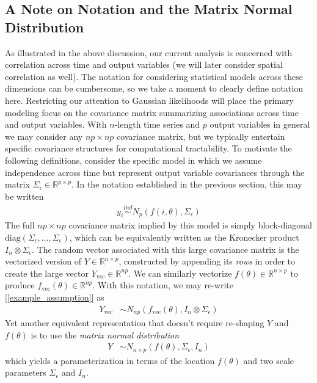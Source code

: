 \documentclass[12pt]{article}
\newcommand{\R}{\mathbb{R}}
\begin{document}
\subsection{A Note on Notation and the Matrix Normal Distribution}
As illustrated in the above discussion, our current analysis is concerned with correlation across time and output variables (we will later consider spatial correlation as well). The 
notation for considering statistical models across these dimensions can be cumbersome, so we take a moment to clearly define notation here. Restricting our attention to Gaussian 
likelihoods will place the primary modeling focus on the covariance matrix summarizing associations across time and output variables. With $n$-length time series and $p$ output 
variables in general we may consider any $np \times np$ covariance matrix, but we typically entertain specific covariance structures for computational tractability. To motivate the 
following definitions, consider the specific model in which we assume independence across time but represent output variable covariances through the matrix $\Sigma_\epsilon \in \R^{p \times p}$. 
In the notation established in the previous section, this may be written
\begin{align}
y_i \overset{ind}{\sim} N_p(f(i, \theta), \Sigma_\epsilon) \label{example_assumption}
\end{align}
The full $np \times np$ covariance matrix implied by this model is simply block-diagonal $\text{diag}(\Sigma_\epsilon, \dots, \Sigma_\epsilon)$, which can be equivalently written as the 
Kronecker product $I_n \otimes \Sigma_\epsilon$. The random vector associated with this large covariance matrix is the vectorized version of $Y \in \R^{n \times p}$, constructed 
by appending its \textit{rows} in order to create the large vector $Y_{\text{vec}} \in \R^{np}$. We can similarly 
vectorize $f(\theta) \in \R^{n \times p}$ to produce $f_{\text{vec}}(\theta) \in \R^{np}$. With this notation, we may re-write [\ref{example_assumption}] as
\begin{align}
Y_{\text{vec}} &\sim N_{np}(f_{\text{vec}}(\theta), I_n \otimes \Sigma_\epsilon)
\end{align}
Yet another equivalent representation that doesn't require re-shaping $Y$ and $f(\theta)$ is to use the \textit{matrix normal distribution}
\begin{align}
Y &\sim N_{n \times p}(f(\theta), \Sigma_\epsilon, I_n)
\end{align}
which yields a parameterization in terms of the location $f(\theta)$ and two scale parameters $\Sigma_\epsilon$ and $I_n$.
\end{document}
